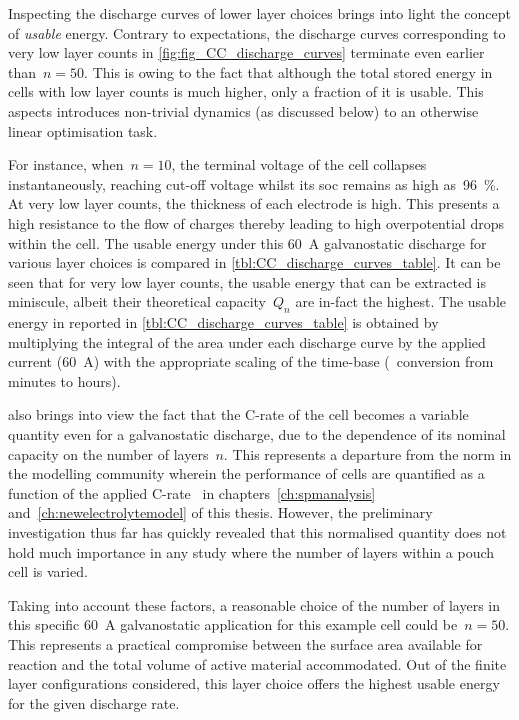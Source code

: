 Inspecting the  discharge curves of  lower layer  choices brings into  light the
concept of \emph{usable} energy. Contrary  to expectations, the discharge curves
corresponding  to very  low layer  counts in  \cref{fig:fig_CC_discharge_curves}
terminate even earlier than~${n=50}$. This is  owing to the fact that although the
total  stored energy  in cells  with low  layer counts  is much  higher, only  a
fraction  of it  is usable.  This  aspects introduces  non-trivial dynamics  (as
discussed below) to an otherwise linear optimisation task.

For  instance,  when~${n  =  10}$,  the terminal  voltage  of  the cell  collapses
instantaneously, reaching cut-off  voltage whilst its \gls{soc}  remains as high
as~\SI{96}{\percent}. At very low layer  counts, the thickness of each electrode
is high. This presents a high resistance  to the flow of charges thereby leading
to  high overpotential  drops  within the  cell. The  usable  energy under  this
\SI{60}{\ampere} galvanostatic  discharge for various layer  choices is compared
in \cref{tbl:CC_discharge_curves_table}. It can be  seen that for very low layer
counts,  the usable  energy that  can be  extracted is  miniscule, albeit  their
theoretical  capacity~$Q_n$  are  in-fact  the highest.  The  usable  energy  in
\SI{}{\watthour} reported in \cref{tbl:CC_discharge_curves_table} is obtained by
multiplying the integral  of the area under each discharge  curve by the applied
current  (\SI{60}{\ampere})  with  the  appropriate  scaling  of  the  time-base
(\ie~conversion from minutes to hours).



  also brings  into view  the fact  that the
\mbox{C-rate} of the  cell becomes a variable quantity even  for a galvanostatic
discharge,  due to  the dependence  of  its nominal  capacity on  the number  of
layers~$n$. This represents a departure from the norm in the modelling community
wherein the  performance of cells  are quantified as  a function of  the applied
C-rate  \eg~in  chapters~\ref{ch:spmanalysis} and~\ref{ch:newelectrolytemodel}
of  this thesis.  However, the  preliminary investigation  thus far  has quickly
revealed that  this normalised  quantity does  not hold  much importance  in any
study where the number of layers within a pouch cell is varied.

Taking into account  these factors, a reasonable choice of  the number of layers
in  this specific  \SI{60}{\ampere} galvanostatic  application for  this example
cell  could  be~${n=50}$.  This  represents  a  practical compromise  between  the
surface area  available for  reaction and  the total  volume of  active material
accommodated.  Out of  the finite  layer configurations  considered, this  layer
choice offers the highest usable energy for the given discharge rate.

